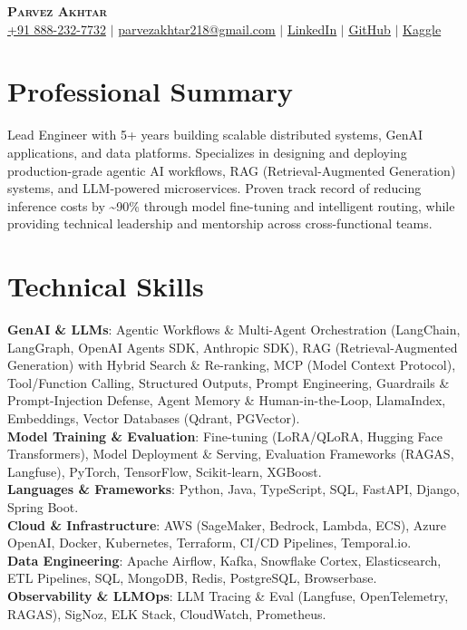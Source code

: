 \documentclass[11pt,a4paper]{article}
\begin{document}
\begin{center}
    \textbf{\Huge \scshape Parvez Akhtar} \\ \vspace{1pt}
    \small \href{tel:+918882327732}{+91 888-232-7732} $|$ \href{mailto:parvezakhtar218@gmail.com}{\underline{parvezakhtar218@gmail.com}} $|$
    \href{https://www.linkedin.com/in/parvezakhtar/}{\underline{LinkedIn}} $|$
    \href{https://github.com/ipmob}{\underline{GitHub}} $|$
    \href{https://www.kaggle.com/parvez218}{\underline{Kaggle}}
\end{center}

\section{Professional Summary}
\small{Lead Engineer with 5+ years building scalable distributed systems, GenAI applications, and data platforms. Specializes in designing and deploying production-grade agentic AI workflows, RAG (Retrieval-Augmented Generation) systems, and LLM-powered microservices. Proven track record of reducing inference costs by \textasciitilde{}90\% through model fine-tuning and intelligent routing, while providing technical leadership and mentorship across cross-functional teams.}

\section{Technical Skills}
 \begin{itemize}[leftmargin=0.15in, label={}]
    \small{\item{
     \textbf{GenAI \& LLMs}{: Agentic Workflows \& Multi-Agent Orchestration (LangChain, LangGraph, OpenAI Agents SDK, Anthropic SDK), RAG (Retrieval-Augmented Generation) with Hybrid Search \& Re-ranking, MCP (Model Context Protocol), Tool/Function Calling, Structured Outputs, Prompt Engineering, Guardrails \& Prompt-Injection Defense, Agent Memory \& Human-in-the-Loop, LlamaIndex, Embeddings, Vector Databases (Qdrant, PGVector).} \\
     \textbf{Model Training \& Evaluation}{: Fine-tuning (LoRA/QLoRA, Hugging Face Transformers), Model Deployment \& Serving, Evaluation Frameworks (RAGAS, Langfuse), PyTorch, TensorFlow, Scikit-learn, XGBoost.} \\
     \textbf{Languages \& Frameworks}{: Python, Java, TypeScript, SQL, FastAPI, Django, Spring Boot.} \\
     \textbf{Cloud \& Infrastructure}{: AWS (SageMaker, Bedrock, Lambda, ECS), Azure OpenAI, Docker, Kubernetes, Terraform, CI/CD Pipelines, Temporal.io.} \\
     \textbf{Data Engineering}{: Apache Airflow, Kafka, Snowflake Cortex, Elasticsearch, ETL Pipelines, SQL, MongoDB, Redis, PostgreSQL, Browserbase.} \\
     \textbf{Observability \& LLMOps}{: LLM Tracing \& Eval (Langfuse, OpenTelemetry, RAGAS), SigNoz, ELK Stack, CloudWatch, Prometheus.}
    }}
 \end{itemize}
\end{document}
